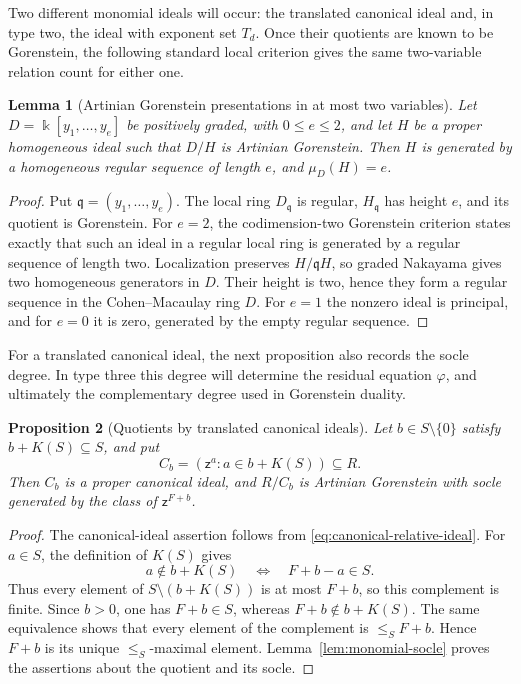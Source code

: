 \documentclass[10pt]{amsart}
\theoremstyle{plain}
\newtheorem{lemma}{Lemma}[section]
\newtheorem{proposition}[lemma]{Proposition}
\begin{document}
Two different monomial ideals will occur: the translated canonical ideal
and, in type two, the ideal with exponent set \(T_d\).  Once their
quotients are known to be Gorenstein, the following standard local
criterion gives the same two-variable relation count for either one.

\begin{lemma}[Artinian Gorenstein presentations in at most two variables]
\label{lem:small-presentation}
Let \(D=\Bbbk[y_1,\ldots,y_e]\) be positively graded, with \(0\le e\le2\),
and let \(H\) be a proper homogeneous ideal such that \(D/H\) is
Artinian Gorenstein.  Then \(H\) is generated by a homogeneous regular
sequence of length \(e\), and \(\mu_D(H)=e\).
\end{lemma}

\begin{proof}
Put \(\mathfrak q=(y_1,\ldots,y_e)\).  The local ring
\(D_{\mathfrak q}\) is regular, \(H_{\mathfrak q}\) has height \(e\),
and its quotient is Gorenstein.  For \(e=2\), the codimension-two Gorenstein criterion
\cite[Corollary~21.20]{Eis95} states exactly that such an ideal in a
regular local ring is generated by a regular sequence of length two.  Localization preserves \(H/\mathfrak qH\), so graded
Nakayama gives two homogeneous generators in \(D\).  Their height is
two, hence they form a regular sequence in the Cohen--Macaulay ring
\(D\).  For \(e=1\) the nonzero ideal is principal, and for \(e=0\) it
is zero, generated by the empty regular sequence.
\end{proof}

For a translated canonical ideal, the next proposition also records the
socle degree.  In type three this degree will determine the residual
equation \(\varphi\), and ultimately the complementary degree used in
Gorenstein duality.

\begin{proposition}[Quotients by translated canonical ideals]
\label{prop:quotient-canonical-ideal}
Let \(b\in S\setminus\{0\}\) satisfy \(b+K(S)\subseteq S\), and put
\[
C_b=(\mathsf z^a:a\in b+K(S))\subseteq R.
\]
Then \(C_b\) is a proper canonical ideal, and \(R/C_b\) is Artinian
Gorenstein with socle generated by the class of \(\mathsf z^{F+b}\).
\end{proposition}

\begin{proof}
The canonical-ideal assertion follows from
\eqref{eq:canonical-relative-ideal}.  For \(a\in S\), the definition of
\(K(S)\) gives
\[
a\notin b+K(S)\quad\Longleftrightarrow\quad F+b-a\in S.
\]
Thus every element of \(S\setminus(b+K(S))\) is at most \(F+b\), so
this complement is finite.  Since \(b>0\), one has \(F+b\in S\),
whereas \(F+b\notin b+K(S)\).  The same equivalence shows that every
element of the complement is \(\le_S F+b\).  Hence \(F+b\) is its
unique \(\le_S\)-maximal element.  Lemma~\ref{lem:monomial-socle}
proves the assertions about the quotient and its socle.
\end{proof}
\end{document}
